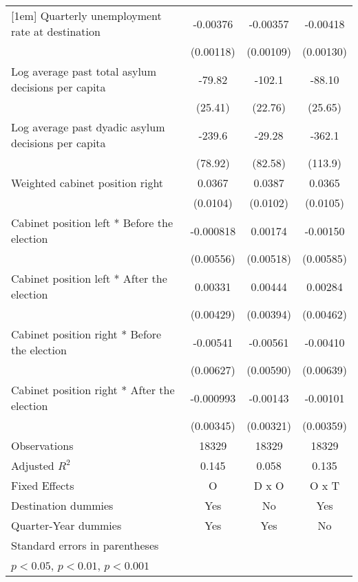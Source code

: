 \begin{table}[htbp]
\begin{tabular}{l*{3}{c}}
[1em]
Quarterly unemployment rate at destination&    -0.00376\sym{**} &    -0.00357\sym{**} &    -0.00418\sym{**} \\
                    &   (0.00118)         &   (0.00109)         &   (0.00130)         \\
[1em]
Log average past total asylum decisions per capita&      -79.82\sym{**} &      -102.1\sym{***}&      -88.10\sym{**} \\
                    &     (25.41)         &     (22.76)         &     (25.65)         \\
[1em]
Log average past dyadic asylum decisions per capita&      -239.6\sym{**} &      -29.28         &      -362.1\sym{**} \\
                    &     (78.92)         &     (82.58)         &     (113.9)         \\
[1em]
Weighted cabinet position right&      0.0367\sym{***}&      0.0387\sym{***}&      0.0365\sym{**} \\
                    &    (0.0104)         &    (0.0102)         &    (0.0105)         \\
[1em]
Cabinet position left * Before the election&   -0.000818         &     0.00174         &    -0.00150         \\
                    &   (0.00556)         &   (0.00518)         &   (0.00585)         \\
[1em]
Cabinet position left * After the election&     0.00331         &     0.00444         &     0.00284         \\
                    &   (0.00429)         &   (0.00394)         &   (0.00462)         \\
[1em]
Cabinet position right * Before the election&    -0.00541         &    -0.00561         &    -0.00410         \\
                    &   (0.00627)         &   (0.00590)         &   (0.00639)         \\
[1em]
Cabinet position right * After the election&   -0.000993         &    -0.00143         &    -0.00101         \\
                    &   (0.00345)         &   (0.00321)         &   (0.00359)         \\
\hline
Observations        &       18329         &       18329         &       18329         \\
Adjusted \(R^{2}\)  &       0.145         &       0.058         &       0.135         \\
Fixed Effects       &           O         &       D x O         &       O x T         \\
Destination dummies &         Yes         &          No         &         Yes         \\
Quarter-Year dummies&         Yes         &         Yes         &          No         \\
\hline\hline
\multicolumn{4}{l}{\footnotesize Standard errors in parentheses}\\
\multicolumn{4}{l}{\footnotesize \sym{*} \(p<0.05\), \sym{**} \(p<0.01\), \sym{***} \(p<0.001\)}\\
\end{tabular}
\end{table}
